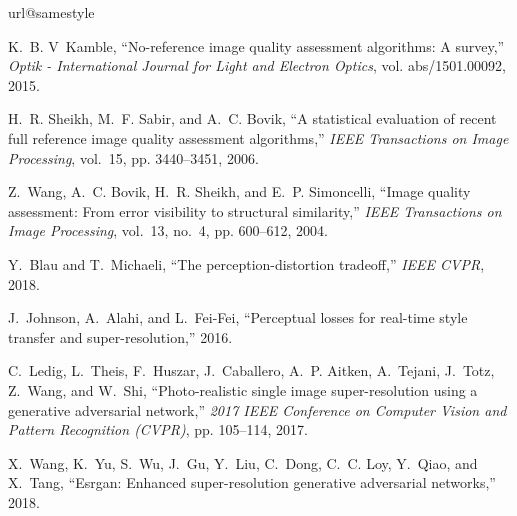 \documentclass[10pt,twocolumn,letterpaper]{article}
\begin{document}

{%
\begin{thebibliography}{10}
\providecommand{\url}[1]{#1}
\csname url@samestyle\endcsname
\providecommand{\newblock}{\relax}
\providecommand{\bibinfo}[2]{#2}
\providecommand{\BIBentrySTDinterwordspacing}{\spaceskip=0pt\relax}
\providecommand{\BIBentryALTinterwordstretchfactor}{4}
\providecommand{\BIBentryALTinterwordspacing}{\spaceskip=\fontdimen2\font plus
\BIBentryALTinterwordstretchfactor\fontdimen3\font minus
  \fontdimen4\font\relax}
\providecommand{\BIBforeignlanguage}[2]{{%
\expandafter\ifx\csname l@#1\endcsname\relax
\typeout{** WARNING: IEEEtran.bst: No hyphenation pattern has been}%
\typeout{** loaded for the language `#1'. Using the pattern for}%
\typeout{** the default language instead.}%
\else
\language=\csname l@#1\endcsname
\fi
#2}}
\providecommand{\BIBdecl}{\relax}
\BIBdecl

K.~B. V~Kamble, ``No-reference image quality assessment algorithms: A survey,''
  \emph{Optik - International Journal for Light and Electron Optics}, vol.
  abs/1501.00092, 2015.

H.~R. Sheikh, M.~F. Sabir, and A.~C. Bovik, ``A statistical evaluation of
  recent full reference image quality assessment algorithms,'' \emph{IEEE
  Transactions on Image Processing}, vol.~15, pp. 3440--3451, 2006.

Z.~Wang, A.~C. Bovik, H.~R. Sheikh, and E.~P. Simoncelli, ``Image quality
  assessment: From error visibility to structural similarity,'' \emph{IEEE
  Transactions on Image Processing}, vol.~13, no.~4, pp. 600--612, 2004.

Y.~Blau and T.~Michaeli, ``The perception-distortion tradeoff,'' \emph{IEEE
  CVPR}, 2018.

J.~Johnson, A.~Alahi, and L.~Fei-Fei, ``Perceptual losses for real-time style
  transfer and super-resolution,'' 2016.

C.~Ledig, L.~Theis, F.~Huszar, J.~Caballero, A.~P. Aitken, A.~Tejani, J.~Totz,
  Z.~Wang, and W.~Shi, ``Photo-realistic single image super-resolution using a
  generative adversarial network,'' \emph{2017 IEEE Conference on Computer
  Vision and Pattern Recognition (CVPR)}, pp. 105--114, 2017.

X.~Wang, K.~Yu, S.~Wu, J.~Gu, Y.~Liu, C.~Dong, C.~C. Loy, Y.~Qiao, and X.~Tang,
  ``Esrgan: Enhanced super-resolution generative adversarial networks,'' 2018.


\end{thebibliography}}
\end{document}
